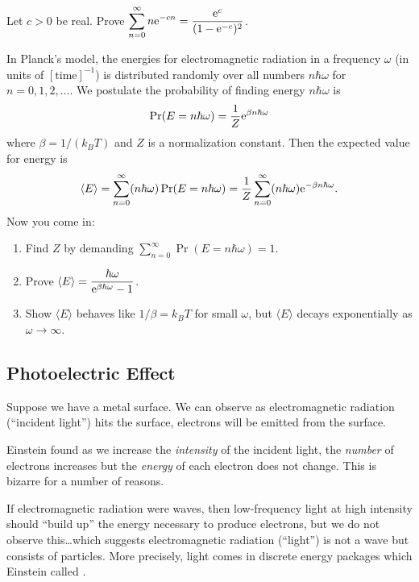 \begin{exercise}
Let $c>0$ be real. Prove $\displaystyle\sum^{\infty}_{n=0}n\mathrm{e}^{-cn}=\frac{\mathrm{e}^{c}}{(1-\mathrm{e}^{-c})^{2}}$.
\end{exercise}

\begin{exercise}
In Planck's model, the energies for electromagnetic radiation in a
frequency $\omega$ (in units of $[\mbox{time}]^{-1}$) is
distributed randomly over all numbers $n\hbar\omega$ for $n=0,1,2,\dots$.
We postulate the probability of finding energy $n\hbar\omega$ is
\begin{equation}
\Pr(E = n\hbar\omega) = \frac{1}{Z}\mathrm{e}^{\beta n\hbar\omega}
\end{equation}
where $\beta = 1/(k_{B}T)$ and $Z$ is a normalization constant. Then the
expected value for energy is
\begin{equation}
\langle E\rangle = \sum^{\infty}_{n=0}(n\hbar\omega)\Pr(E=n\hbar\omega)= \frac{1}{Z}\sum^{\infty}_{n=0}(n\hbar\omega)\mathrm{e}^{-\beta n\hbar\omega}.
\end{equation}
Now you come in:
\begin{enumerate}
\item Find $Z$ by demanding $\sum_{n=0}^{\infty}\Pr(E = n\hbar\omega)=1$.
\item Prove $\displaystyle\langle E\rangle = \frac{\hbar\omega}{\mathrm{e}^{\beta\hbar\omega}-1}$.
\item Show $\langle E\rangle$ behaves like $1/\beta = k_{B}T$ for small $\omega$,
but $\langle E\rangle$ decays exponentially as $\omega\to\infty$.
\end{enumerate}
\end{exercise}

\subsection{Photoelectric Effect}

Suppose we have a metal surface. We can observe as electromagnetic
radiation (``incident light'') hits the surface, electrons will be emitted from the surface.

Einstein found as we increase the \emph{intensity} of the incident
light, the \emph{number} of electrons increases but the \emph{energy} of
each electron does not change. This is bizarre for a number of reasons.

If electromagnetic radiation were waves, then low-frequency light at
high intensity  should ``build up'' the energy necessary to produce
electrons, but we do not observe this\dots which suggests
electromagnetic radiation (``light'') is not a wave but consists of
particles. More precisely, light comes in discrete energy packages which
Einstein called .

